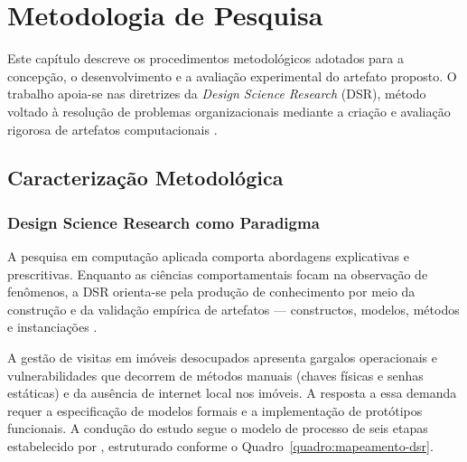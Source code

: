 \chapter{Metodologia de Pesquisa}
\label{cap:metodologia}

Este capítulo descreve os procedimentos metodológicos adotados para a concepção, o desenvolvimento e a avaliação experimental do artefato proposto. O trabalho apoia-se nas diretrizes da \textit{Design Science Research} (DSR), método voltado à resolução de problemas organizacionais mediante a criação e avaliação rigorosa de artefatos computacionais \cite{hevner2004,peffers2007}.

\section{Caracterização Metodológica}
\label{sec:dsr-caracterizacao}

\subsection{Design Science Research como Paradigma}
\label{subsec:dsr-paradigma}

A pesquisa em computação aplicada comporta abordagens explicativas e prescritivas. Enquanto as ciências comportamentais focam na observação de fenômenos, a DSR orienta-se pela produção de conhecimento por meio da construção e da validação empírica de artefatos --- constructos, modelos, métodos e instanciações \cite{hevner2004}. 

A gestão de visitas em imóveis desocupados apresenta gargalos operacionais e vulnerabilidades que decorrem de métodos manuais (chaves físicas e senhas estáticas) e da ausência de internet local nos imóveis. A resposta a essa demanda requer a especificação de modelos formais e a implementação de protótipos funcionais. A condução do estudo segue o modelo de processo de seis etapas estabelecido por , estruturado conforme o Quadro~\ref{quadro:mapeamento-dsr}.

